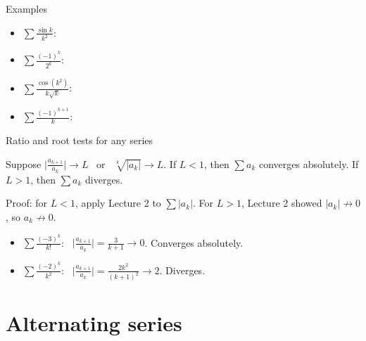 \documentclass[10pt]{wosm-slides}
\begin{document}
\begin{frame}{Examples}
  \begin{itemize}
    \item $\displaystyle\sum \frac{\sin k}{k^2}$:
    \item $\displaystyle\sum \frac{(-1)^k}{2^k}$:
    \item $\displaystyle\sum \frac{\cos(k^2)}{k\sqrt{k}}$:
    \item $\displaystyle\sum \frac{(-1)^{k+1}}{k}$:
  \end{itemize}
\end{frame}

\begin{frame}{Ratio and root tests for any series}
  \begin{theorem}
    Suppose $\bigl|\frac{a_{k+1}}{a_k}\bigr| \to L$ \ or \ $\sqrt[k]{|a_k|} \to L$.
    If $L < 1$, then $\sum a_k$ converges absolutely.
    If $L > 1$, then $\sum a_k$ diverges.
  \end{theorem}
  {\small Proof: for $L < 1$, apply Lecture 2 to $\sum |a_k|$. For $L > 1$, Lecture 2
  showed $|a_k| \not\to 0$, so $a_k \not\to 0$.\par}
  \pause
  \begin{example}
    \begin{itemize}
      \item $\sum \frac{(-3)^k}{k!}$: \ $\bigl|\frac{a_{k+1}}{a_k}\bigr| = \frac{3}{k+1} \to 0$.
        Converges absolutely.
      \item $\sum \frac{(-2)^k}{k^2}$: \ $\bigl|\frac{a_{k+1}}{a_k}\bigr| = \frac{2k^2}{(k+1)^2} \to 2$.
        Diverges.
    \end{itemize}
  \end{example}
\end{frame}

\section{Alternating series}
\end{document}

